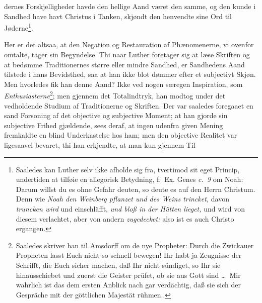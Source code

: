 \documentclass[12pt]{book}
\newcommand{\opage}[1]{\marginnote{\footnotesize\textit{[#1]}}}
\begin{document}
\opage{66}\setcounter{footnote}{0}%
dernes Forskjelligheder havde den hellige Aand været den samme, og den kunde i
Sandhed have havt Christus i Tanken, skjøndt den henvendte sine Ord til
Jøderne\footnote{Saaledes kan Luther selv ikke afholde sig fra, tvertimod sit
eget Princip, undertiden at tilføie en allegorisk Betydning, f.~Ex. Genes
\textit{c.~9} om Noah: Darum willst du es ohne Gefahr deuten, so deute es auf
den Herrn Christum. Denn wie \emph{Noah den Weinberg pflanzet und des Weins
trincket,} davon \emph{truncken wird} und einschläfft, \emph{und bloß in der
Hütten lieget,} und wird von diesem verlachtet, aber von andern
\emph{zugedecket:} also ist es auch Christo ergangen.}.

Her er det altsaa, at den Negation og Restauration af Phænomenerne, vi
ovenfor omtalte, tager sin Begyndelse. Thi naar Luther foretager sig at læse
Skriften og at bedømme Traditionernes større eller mindre Sandhed, er
Sandhedens Aand tilstede i hans Bevidsthed, saa at han ikke blot dømmer efter
et subjectivt Skjøn. Men hvorledes fik han denne Aand? Ikke ved nogen særegen
Inspiration, som \emph{Enthusiasterne}\footnote{Saaledes skriver han til
Amsdorff om de nye Propheter: Durch die Zwickauer Propheten lasst Euch nicht
so schnell bewegen! Ihr habt ja Zeugnisse der Schrifft, die Euch sicher
machen, daß Ihr nicht sündiget, so Ihr sie hinausschiebet und zuerst die
Geister prüfet, ob sie aus Gott sind \ldots\ Mir wahrlich ist das dem ersten
Anblick nach gar verdächtig, daß sie sich der Gespräche mit der göttlichen
Majestät rühmen..}; men gjennem det Totalindtryk, han modtog under det
vedholdende Studium af Traditionerne og Skriften. Der var saaledes foregaaet
en sand Forsoning af det objective og subjective Moment; at han gjorde sin
subjective Frihed gjældende, sees deraf, at ingen udenfra given Mening
fremkaldte en blind Underkastelse hos ham; men den objective Realitet var
ligesaavel bevaret, thi han erkjendte, at man kun gjennem Til\-%
\end{document}
